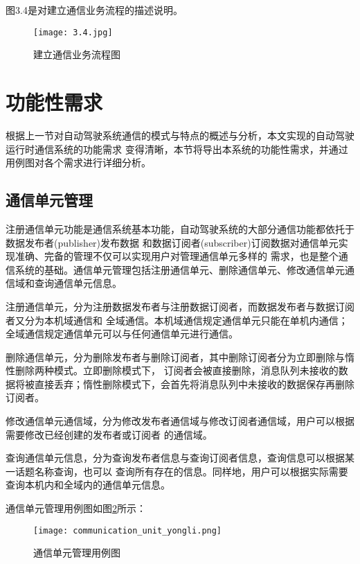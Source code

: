 图3.4是对建立通信业务流程的描述说明。
\begin{figure}[H]
  \centering
  \texttt{[image: 3.4.jpg]}
  \caption{建立通信业务流程图}
  \label{fig:16}
\end{figure}

\section{功能性需求}
根据上一节对自动驾驶系统通信的模式与特点的概述与分析，本文实现的自动驾驶运行时通信系统的功能需求
变得清晰，本节将导出本系统的功能性需求，并通过用例图对各个需求进行详细分析。

\subsection{通信单元管理}
注册通信单元功能是通信系统基本功能，自动驾驶系统的大部分通信功能都依托于数据发布者(publisher)发布数据
和数据订阅者(subscriber)订阅数据对通信单元实现准确、完备的管理不仅可以实现用户对管理通信单元多样的
需求，也是整个通信系统的基础。通信单元管理包括注册通信单元、删除通信单元、修改通信单元通信域和查询通信单元信息。

注册通信单元，分为注册数据发布者与注册数据订阅者，而数据发布者与数据订阅者又分为本机域通信和
全域通信。本机域通信规定通信单元只能在单机内通信；全域通信规定通信单元可以与任何通信单元进行通信。

删除通信单元，分为删除发布者与删除订阅者，其中删除订阅者分为立即删除与惰性删除两种模式。立即删除模式下，
订阅者会被直接删除，消息队列未接收的数据将被直接丢弃；惰性删除模式下，会首先将消息队列中未接收的数据保存再删除
订阅者。

修改通信单元通信域，分为修改发布者通信域与修改订阅者通信域，用户可以根据需要修改已经创建的发布者或订阅者
的通信域。

查询通信单元信息，分为查询发布者信息与查询订阅者信息，查询信息可以根据某一话题名称查询，也可以
查询所有存在的信息。同样地，用户可以根据实际需要查询本机内和全域内的通信单元信息。

通信单元管理用例图如图\ref{communication_unit_yongli}所示：
\begin{figure}[H]
  \centering
  \texttt{[image: communication\_unit\_yongli.png]}
  \caption{通信单元管理用例图}
  \label{communication_unit_yongli}
\end{figure}

